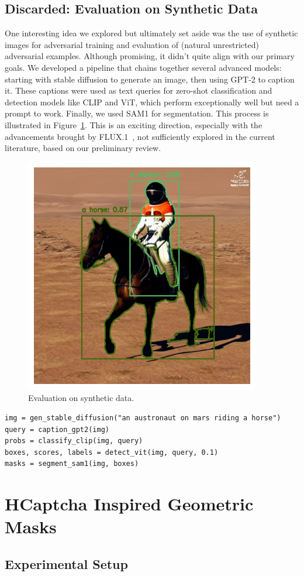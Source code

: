\documentclass[a4paper, oneside]{discothesis}
\begin{document}
\subsection{Discarded: Evaluation on Synthetic Data}

One interesting idea we explored but ultimately set aside was the use of synthetic images for adversarial training and evaluation of (natural unrestricted) adversarial examples. Although promising, it didn't quite align with our primary goals. We developed a pipeline that chains together several advanced models: starting with stable diffusion to generate an image, then using GPT-2 to caption it. These captions were used as text queries for zero-shot classification and detection models like CLIP and ViT, which perform exceptionally well but need a prompt to work. Finally, we used SAM1 for segmentation. This process is illustrated in Figure~\ref{fig:chained}. This is an exciting direction, especially with the advancements brought by FLUX.1~\cite{BlackForestLabs2024FLUX}, not sufficiently explored in the current literature, based on our preliminary review.

\begin{figure}
	\centering
	\includegraphics[width=0.3\columnwidth]{figures/chained.png}
	\caption{Evaluation on synthetic data.}
	\label{fig:chained}
\end{figure}

\begin{verbatim}
img = gen_stable_diffusion("an austronaut on mars riding a horse")
query = caption_gpt2(img)
probs = classify_clip(img, query)
boxes, scores, labels = detect_vit(img, query, 0.1)
masks = segment_sam1(img, boxes)
\end{verbatim}

% 
% 

\section{HCaptcha Inspired Geometric Masks}

\subsection{Experimental Setup}
\end{document}

